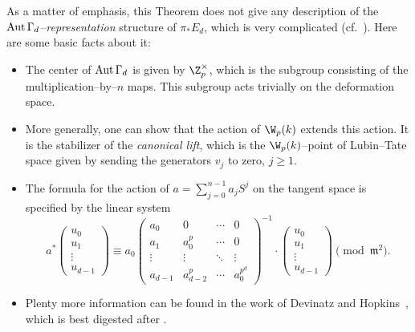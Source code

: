 \begin{remark}\label{StablizerRepIsComplicated}
As a matter of emphasis, this Theorem does not give any description of the \(\operatorname{Aut} \Gamma_d\)--\emph{representation} structure of \(\pi_* E_d\), which is very complicated (cf.\ ).  Here are some basic facts about it:
\begin{itemize}
    \item The center of \(\operatorname{Aut} \Gamma_d\) is given by \(\Z_p^\times\), which is the subgroup consisting of the multiplication--by--\(n\) maps.  This subgroup acts trivially on the deformation space.
    \item More generally, one can show that the action of \(\W_p(k)\) extends this action.  It is the stabilizer of the \textit{canonical lift}, which is the \(\W_p(k)\)--point of Lubin--Tate space given by sending the generators \(v_j\) to zero, \(j \ge 1\).
    \item The formula for the action of \(a = \sum_{j=0}^{n-1} a_j S^j\) on the tangent space is specified by the linear system \[a^* \left( \begin{array}{c} u_0 \\ u_1 \\ \vdots \\ u_{d-1} \end{array}\right) \equiv a_0 \left( \begin{array}{cccc} a_0 & 0 & \cdots & 0 \\ a_1 & a_0^p & \cdots & 0 \\ \vdots & \vdots & \ddots & \vdots \\ a_{d-1} & a_{d-2}^p & \cdots & a_0^{p^d} \end{array} \right)^{-1} \cdot \left( \begin{array}{c} u_0 \\ u_1 \\ \vdots \\ u_{d-1} \end{array} \right) \pmod{\mathfrak{m}^2}.\]
    \item Plenty more information can be found in the work of Devinatz and Hopkins~\cite{DevinatzHopkins}, which is best digested after .
\end{itemize}
\end{remark}

